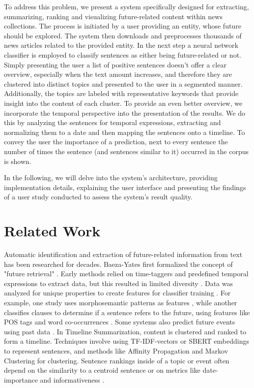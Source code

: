 \documentclass[10pt,twocolumn]{article}
\begin{document}
\noindent To address this problem, we present a system specifically designed for extracting, summarizing, ranking and visualizing future-related content within news collections. The process is initiated by a user providing an entity, whose future should be explored. The system then downloads and preprocesses thousands of news articles related to the provided entity. In the next step a neural network classifier is employed to classify sentences as either being future-related or not. Simply presenting the user a list of positive sentences doesn't offer a clear overview, especially when the text amount increases, and therefore they are clustered into distinct topics and presented to the user in a segmented manner. Additionally, the topics are labeled with representative keywords that provide insight into the content of each cluster. To provide an even better overview, we incorporate the temporal perspective into the presentation of the results. We do this by analyzing the sentences for temporal expressions, extracting and normalizing them to a date and then mapping the sentences onto a timeline. To convey the user the importance of a prediction, next to every sentence the number of times the sentence (and sentences similar to it) occurred in the corpus is shown.

\noindent In the following, we will delve into the system's architecture, providing implementation details, explaining the user interface and presenting the findings of a user study conducted to assess the system's result quality.

\section{Related Work}
Automatic identification and extraction of future-related information from text has been researched for decades. Baeza-Yates \cite{BaezaYatesSearchingTF} first formalized the concept of "future retrieval" . Early methods relied on time-taggers and predefined temporal expressions to extract data, but this resulted in limited diversity \cite{chronoseeker, supportingAnalysis, analyzingCollective, rankingRelated, extractingCollective}. Data was analyzed for unique properties \cite{improvingRetrieval} to create features for classifier training \cite{computationalExploration}.
For example, one study uses morphosemantic patterns as features \cite{automaticExtraction}, while another classifies clauses to determine if a sentence refers to the future, using features like POS tags and word co-occurrences \cite{extractingPredictive}. Some systems also predict future events using past data \cite{miningTheWeb, predictingTheNews}.
In Timeline Summarization, content is clustered and ranked to form a timeline. Techniques involve using TF-IDF-vectors or SBERT embeddings \cite{sbert} to represent sentences, and methods like Affinity Propagation \cite{abstractiveTimeline, multiTimeline} and Markov Clustering \cite{stateOfTheArtTimeline} for clustering. Sentence rankings inside of a topic or event often depend on the similarity to a centroid sentence \cite{stateOfTheArtTimeline} or on metrics like date-importance and informativeness \cite{abstractiveTimeline}.
\end{document}
